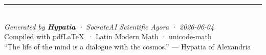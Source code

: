\documentclass[12pt,a4paper]{report}
\theoremstyle{plain}
\theoremstyle{definition}
\theoremstyle{remark}
\begin{document}
\vfill
\begin{center}
\rule{0.5\textwidth}{0.4pt}\\[1em]
{\itshape Generated by \textbf{Hypatia} · SocrateAI Scientific Agora · 2026-06-04}\\[0.3em]
{\small Compiled with pdf\LaTeX\ · Latin Modern Math · unicode-math}\\[0.3em]
{\small ``The life of the mind is a dialogue with the cosmos.'' — Hypatia of Alexandria}
\end{center}
\end{document}
